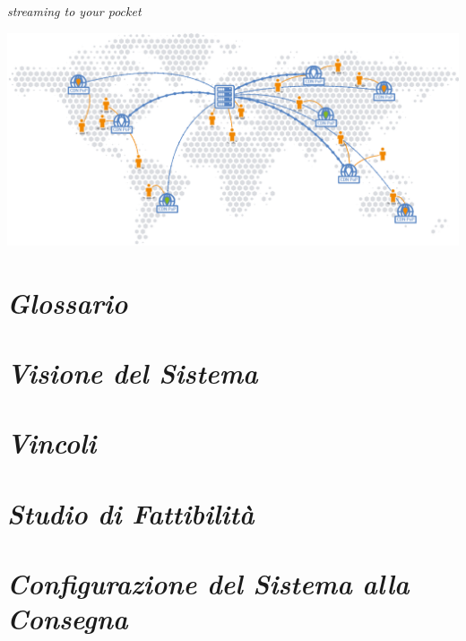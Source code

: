 \documentclass{article}
\author{Agosta, Belli, Emili, Giacchini, Luciani}
\begin{document}
\begin{center}
    \sffamily{\fontsize{50}{48} \selectfont \textcolor{red}{Nexi}\textcolor{green}{Fy}}
\end{center}

\begin{center}
    \itshape{\fontsize{20}{48} \selectfont streaming to your pocket}
\end{center}

\bigskip\bigskip\bigskip

\begin{flushleft}
    \includegraphics[scale=1]{images/worldCDN.png}
\end{flushleft}

\newpage
\printindex

\tableofcontents

\newpage
\section{\itshape{Glossario}}


\newpage
\section{\itshape{Visione del Sistema}}


\newpage
\section{\itshape{Vincoli}}


\section{\itshape{Studio di Fattibilità}}


\section{\itshape{Configurazione del Sistema alla Consegna}}

\end{document}
